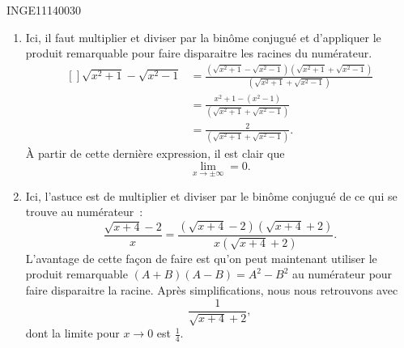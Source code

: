 

\begin{corrige}{INGE11140030}

	\begin{enumerate}

		\item
			Ici, il faut multiplier et diviser par la binôme conjugué et d'appliquer le produit remarquable pour faire disparaitre les racines du numérateur.
			\begin{equation}
				\begin{aligned}[]
					\sqrt{x^2+1}-\sqrt{x^2-1}	&=		\frac{ \left(\sqrt{x^2+1}-\sqrt{x^2-1}\right) \left(\sqrt{x^2+1}+\sqrt{x^2-1}\right)  }{  \left(\sqrt{x^2+1}+\sqrt{x^2-1}\right)  }\\
					&=\frac{ x^2+1-(x^2-1) }{  \left(\sqrt{x^2+1}+\sqrt{x^2-1}\right)  }\\
					&=\frac{ 2 }{  \left(\sqrt{x^2+1}+\sqrt{x^2-1}\right)  }.
				\end{aligned}
			\end{equation}
			À partir de cette dernière expression, il est clair que
			\begin{equation}
				\lim_{x\to \pm\infty} =0.
			\end{equation}

		\item
			Ici, l'astuce est de multiplier et diviser par le binôme conjugué de ce qui se trouve au numérateur~:
			\begin{equation}
				\frac{ \sqrt{x+4}-2 }{ x }= \frac{ \left( \sqrt{x+4}-2 \right)\left( \sqrt{x+4}+2 \right)}{ x\left( \sqrt{x+4}+2 \right) }.
			\end{equation}
			L'avantage de cette façon de faire est qu'on peut maintenant utiliser le produit remarquable $(A+B)(A-B)=A^2-B^2$ au numérateur pour faire disparaitre la racine. Après simplifications, nous nous retrouvons  avec
			\begin{equation}
				\frac{1}{ \sqrt{x+4}+2 },
			\end{equation}
			dont la limite pour $x\to 0$ est $\frac{1}{ 4 }$.

	\end{enumerate}

\end{corrige}

